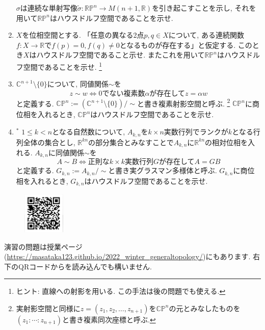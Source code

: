 \documentclass[dvipdfmx,a4paper,11pt]{article}
\newcommand{\R}{\mathbb{R}}
\newcommand{\C}{\mathbb{C}}
\theoremstyle{definition}
\begin{document}
\begin{enumerate}[label=\textbf{問}7.\arabic*]
 $\sigma$は連続な単射写像$\tilde{\sigma} : \R\mathbb{P}^{n} \rightarrow M(n+1, \R)$を引き起こすことを示し, それを用いて$\R\mathbb{P}^{n}$はハウスドルフ空間であることを示せ. 
 
\item $X$を位相空間とする. 「任意の異なる2点$p, q \in X$について, ある連続関数$f : X \rightarrow \R$で$f(p)=0, f(q)\neq 0$となるものが存在する」と仮定する. このとき$X$はハウスドルフ空間であること示せ. またこれを用いて$\R\mathbb{P}^{n}$はハウスドルフ空間であることを示せ. \footnote{ヒント: 直線への射影を用いる. この手法は後の問題でも使える.}
  

\item $\C^{n+1} \setminus \{ 0\}$について, 同値関係$\sim$を
	$$
	z \sim w \Leftrightarrow \text{0でない複素数$\alpha$が存在して$z = \alpha w$}
	$$
	と定義する. $ \C\mathbb{P}^{n}:= (\C^{n+1} \setminus \{ 0\})/\sim$と書き複素射影空間と呼ぶ. \footnote{実射影空間と同様に$z = (z_{1}, z_{2}, \ldots, z_{n+1})$を$\C\mathbb{P}^{n}$の元とみなしたものを$(z_{1}: \cdots : z_{n+1})$と書き複素同次座標と呼ぶ. }
	$\C\mathbb{P}^{n}$に商位相を入れるとき, $\C\mathbb{P}^{n}$はハウスドルフ空間であることを示せ.

\item $^{*}$ $1 \le k < n$となる自然数について, 
$A_{k, n}$を$k \times n$実数行列でランクが$k$となる行列全体の集合とし, $\R^{kn}$の部分集合とみなすことで$A_{k,n}$に$\R^{kn}$の相対位相を入れる. 
$A_{k, n}$に同値関係$\sim$を
$$
	A \sim B \Leftrightarrow \text{正則な$k \times k$実数行列$G$が存在して$A = GB$}
$$
と定義する. $G_{k,n}:= A_{k, n}/\sim$と書き実グラスマン多様体と呼ぶ. $G_{k,n}$に商位相を入れるとき, $G_{k,n}$はハウスドルフ空間であることを示せ. 



 \end{enumerate}
 
 \vspace{11pt}
\begin{figure}
  \centering
 \includegraphics[height=20mm, width=20mm]{genetopo.png}
\end{figure}
演習の問題は授業ページ(\url{https://masataka123.github.io/2022_winter_generaltopology/})にもあります. 
右下のQRコードからを読み込んでも構いません.
\end{document}

